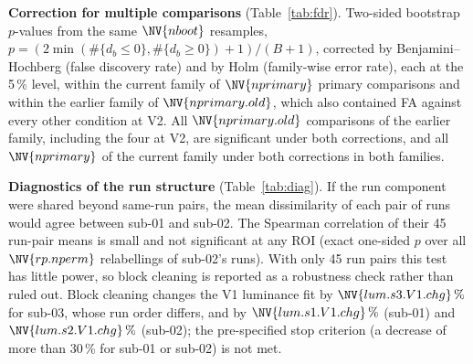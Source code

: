 \documentclass[10pt,twocolumn]{article}
\begin{document}
\begin{table}[h]
\centering
\caption{Differences at V2 ($\rho_{\text{subj}}(A) - \rho_{\text{subj}}(B)$, stimulus-bootstrap 95\% CI; cross-run pairs, repaired model set) with V2 assigned to Conv1 (main analysis) or to Conv2. Random $-$ BP is a primary comparison; the comparisons with FA at V2 are exploratory, because their ordering depends on the layer assignment.}
\label{tab:v2conv2}
\small
\resizebox{\columnwidth}{!}{%
}
\end{table}

\textbf{Correction for multiple comparisons} (Table~\ref{tab:fdr}). Two-sided bootstrap $p$-values from the same $\NV{nboot}$ resamples, $p = (2\min(\#\{d_b \le 0\}, \#\{d_b \ge 0\}) + 1)/(B + 1)$, corrected by Benjamini--Hochberg (false discovery rate) and by Holm (family-wise error rate), each at the 5\,\% level, within the current family of $\NV{nprimary}$ primary comparisons and within the earlier family of $\NV{nprimary.old}$, which also contained FA against every other condition at V2. All $\NV{nprimary.old}$ comparisons of the earlier family, including the four at V2, are significant under both corrections, and all $\NV{nprimary}$ of the current family under both corrections in both families.

\begin{table}[t]
\centering
\caption{All $\NV{nprimary.old}$ comparisons of the earlier primary family with bootstrap $p$-values and adjusted $p$-values (Benjamini--Hochberg, Holm) within the current family of $\NV{nprimary}$ (above the line) and within the earlier family of $\NV{nprimary.old}$ (all rows; the four below the line belonged to the earlier family only). Per-subject convention, cross-run pairs, repaired model set. The smallest attainable bootstrap $p$ is $1/(B+1)$.}
\label{tab:fdr}
\small

\end{table}

\textbf{Diagnostics of the run structure} (Table~\ref{tab:diag}). If the run component were shared beyond same-run pairs, the mean dissimilarity of each pair of runs would agree between sub-01 and sub-02. The Spearman correlation of their 45 run-pair means is small and not significant at any ROI (exact one-sided $p$ over all $\NV{rp.nperm}$ relabellings of sub-02's runs). With only 45 run pairs this test has little power, so block cleaning is reported as a robustness check rather than ruled out. Block cleaning changes the V1 luminance fit by $\NV{lum.s3.V1.chg}\,\%$ for sub-03, whose run order differs, and by $\NV{lum.s1.V1.chg}\,\%$ (sub-01) and $\NV{lum.s2.V1.chg}\,\%$ (sub-02); the pre-specified stop criterion (a decrease of more than 30\,\% for sub-01 or sub-02) is not met.
\end{document}
